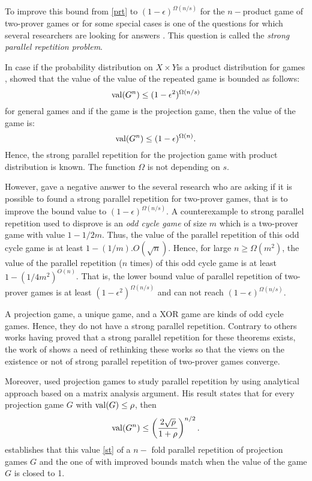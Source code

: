 To improve this bound from \eqref{prt} to $(1-\epsilon)^{\Omega(n/s)}$ for the $n-$product game of two-prover games or for some special cases  is one of the questions for which several researchers are looking for answers \citep{raz2010parallel}.  This question is called the \textit{strong parallel repetition problem}.

In case if the probability distribution on $X \times Y$is a product distribution  for games , \cite{barak2009strong}  showed that the value of the value of the repeated game is bounded  as follows:
 $$\mathrm{val} (G^n) \leq (1-\epsilon^2)^{\Omega(n/s)}$$
for general games and if the game is the projection game, then the value of the game is: $$\mathrm{val} (G^n) \leq (1-\epsilon)^{\Omega(n)}.$$
Hence, the strong parallel repetition for the projection game with product distribution is known. The function $\Omega$ is not depending on $s.$

However, \cite{raz2011counterexample} gave a negative answer to the several research who are asking if it is possible to found a strong parallel repetition for two-prover games, that is to improve the bound value to  $(1-\epsilon)^{\Omega(n/s)}.$ A counterexample to strong parallel repetition used to disprove is an \textit{odd cycle game} of size $m$ which is a two-prover game with value $1-1/2m.$ Thus, the value of the parallel repetition of this odd cycle game is at least $1-(1/m).O(\sqrt{n})$. Hence, for large $n \geq \Omega(m^2)$, the value of  the parallel repetition ($n$ times) of this odd cycle game is at least $1-(1/4m^2)^{O(n)}$. That is, the lower bound value of parallel repetition of two-prover games is at least $(1-\epsilon^2)^{\Omega(n/s)}$ and can not reach $(1-\epsilon)^{\Omega(n/s)}.$

A projection game, a unique game, and a XOR game are kinds of odd cycle games. Hence, they do not have a strong parallel repetition. Contrary to others works having proved that a strong parallel repetition for these theorems exists, the work of  \cite{raz2011counterexample} shows a need of rethinking these works so that the views on the existence or not of strong parallel repetition of  two-prover games converge. 

Moreover, \cite{dinur2014analytical} used projection games to study parallel repetition by using analytical approach based on a matrix analysis argument. His result states that for every projection game $G$ with $\mathrm{val} (G) \leq \rho$, then  \begin{align}
\mathrm{val} (G^n) \leq \left(\frac{2\sqrt{\rho}}{1+\rho} \right)^{n/2}. \label{st}
\end{align}
\cite{dinur2014analytical} establishes that this value \eqref{st} of a $n-$ fold parallel repetition of projection games $G$ and the one of \cite{rao2011parallel} with improved bounds match when the value of the game $G$ is closed to 1.

